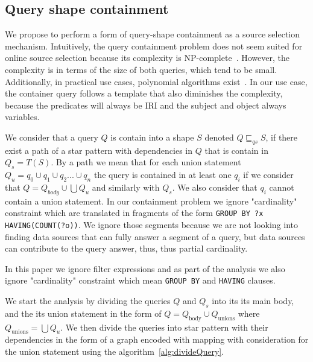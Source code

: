 \subsection{Query shape containment}\label{sec:containment}

We propose to perform a form of query-shape containment as a source selection mechanism.
Intuitively, the query containment problem does not seem suited for online source selection because its complexity is NP-complete~\cite{Spasi2023}.
However, the complexity is in terms of the size of both queries, which tend to be small.
Additionally, in practical use cases, polynomial algorithms exist~\cite{Doan2012}.
In our use case, the container query follows a template that also diminishes the complexity, because the predicates will always be 
IRI and the subject and object always variables.

We consider that a query $Q$ is contain into a shape $S$ denoted $Q \sqsubseteq_{qs} S$, if there exist a path of a star pattern with dependencies in $Q$ 
that is contain in $Q_s = T(S)$.
By a path we mean that for each union statement $Q_u = q_0 \cup q_1 \cup q_2 ... \cup q_n$ the query is contained in at least one $q_i$ if we 
consider that $Q = Q_{body} \cup \bigcup Q_u$ and similarly with $Q_s$.
We also consider that $q_i$ cannot contain a union statement.
In our containment problem we ignore "cardinality" constraint which are translated in 
fragments of the form \texttt{GROUP BY ?x HAVING(COUNT(?o))}.
We ignore those segments because we are not looking into finding data sources that can fully answer a segment of a query,
but data sources can contribute to the query answer, thus, thus partial cardinality.

In this paper we ignore filter expressions and as part of the analysis we also ignore "cardinality" constraint 
which mean \texttt{GROUP BY} and \texttt{HAVING} clauses.


We start the analysis by dividing the queries $Q$ and $Q_s$ into its its main body, and the its union statement in the form of 
$Q = Q_{\text{body}} \cup Q_{\text{unions}}$ where $Q_{\text{unions}} = \bigcup Q_u$.
We then divide the queries into star pattern with their dependencies in the form of a graph encoded with mapping with consideration for the union statement using the algorithm~\ref{alg:divideQuery}.

